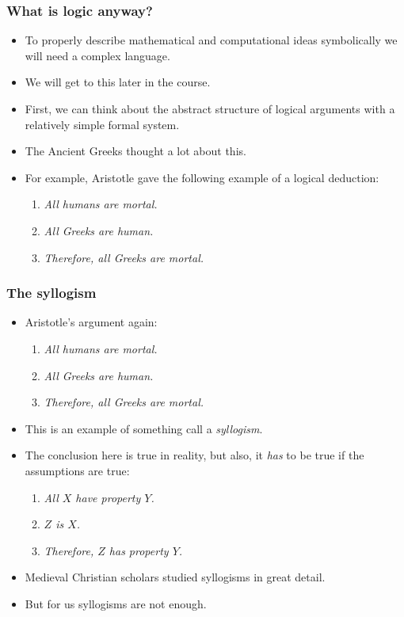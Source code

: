 \documentclass[handout]{beamer}
\begin{document}
\begin{frame}
\frametitle{What is logic anyway?}
\begin{itemize}
\item To properly describe mathematical and computational ideas symbolically we will need a complex language.
\vspace{0.2cm}
\item We will get to this later in the course. 
\vspace{0.2cm}
\item First, we can think about the abstract structure of logical arguments with a relatively simple formal system.
\vspace{0.2cm}
\item The Ancient Greeks thought a lot about this. 
\vspace{0.2cm}
\item For example, Aristotle gave the following example of a logical deduction: 
\begin{enumerate}
\item \emph{All humans are mortal.} 
\item\emph{All Greeks are human.}
\item\emph{Therefore, all Greeks are mortal.}
\end{enumerate}
\end{itemize}
\end{frame}

\begin{frame}
\frametitle{The syllogism}
\begin{itemize}
\item Aristotle's argument again:
\begin{enumerate}
\item \emph{All humans are mortal.} 
\item\emph{All Greeks are human.}
\item\emph{Therefore, all Greeks are mortal.}
\end{enumerate}
\vspace{0.2cm}
\item This is an example of something call a \emph{syllogism}. 
\vspace{0.2cm}
\item The conclusion here is true in reality, but also, it \emph{has} to be true if the assumptions are true:
\begin{enumerate}
\item \emph{All $X$ have property $Y$.} 
\item\emph{$Z$ is $X$.}
\item\emph{Therefore, $Z$ has property $Y$.}
\end{enumerate}
\vspace{0.2cm}
\item Medieval Christian scholars studied syllogisms in great detail.
\vspace{0.2cm}
\item But for us syllogisms are not enough.
\end{itemize}
\end{frame}
\end{document}

